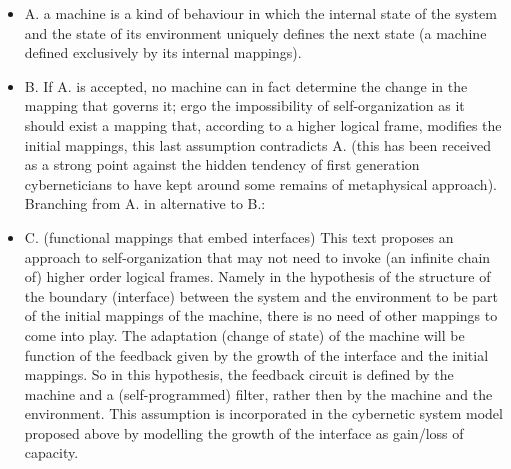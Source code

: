 \documentclass[14pt,a4paper]{extarticle}
\begin{document}
\begin{itemize}
\item A. a machine is a kind of behaviour in which the internal state of the system and the state of its environment uniquely defines the next state (a machine defined exclusively by its internal mappings).
\item B. If A. is accepted, no machine can in fact determine the change in the mapping that governs it; ergo the impossibility of self-organization as it should exist a mapping that, according to a higher logical frame, modifies the initial mappings, this last assumption contradicts A. (this has been received as a strong point against the hidden tendency of first generation cyberneticians to have kept around some remains of metaphysical approach).
\newline
\newline
Branching from A. in alternative to B.:
\item C. (functional mappings that embed interfaces) This text proposes an approach to self-organization that may not need to invoke (an infinite chain of) higher order logical frames. Namely in the hypothesis of the structure of the boundary (interface) between the system and the environment to be part of the initial mappings of the machine, there is no need of other mappings to come into play. The adaptation (change of state) of the machine will be function of the feedback given by the growth of the interface and the initial mappings. So in this hypothesis, the feedback circuit is defined by the machine and a (self-programmed) filter, rather then by the machine and the environment. This assumption is incorporated in the cybernetic system model proposed above by modelling the growth of the interface as gain/loss of capacity. 
\end{itemize}
\end{document}
